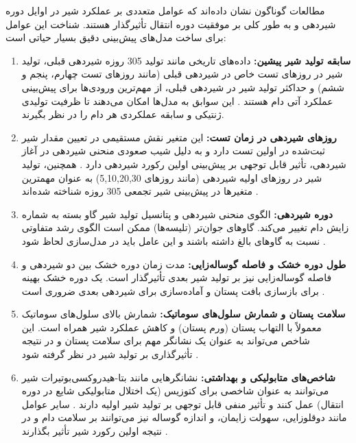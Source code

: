 مطالعات گوناگون نشان داده‌اند که عوامل متعددی بر عملکرد شیر در اوایل دوره شیردهی و به طور کلی بر موفقیت دوره انتقال تأثیرگذار هستند. شناخت این عوامل برای ساخت مدل‌های پیش‌بینی دقیق بسیار حیاتی است:
	\begin{enumerate}
	\item \textbf{سابقه تولید شیر پیشین:} داده‌های تاریخی مانند تولید 305 روزه شیردهی قبلی، تولید شیر در روزهای تست خاص در شیردهی قبلی (مانند روزهای تست چهارم، پنجم و ششم) و حداکثر تولید شیر در شیردهی قبلی، از مهم‌ترین ورودی‌ها برای پیش‌بینی عملکرد آتی دام هستند \cite{Salamone2022}. این سوابق به مدل‌ها امکان می‌دهند تا ظرفیت تولیدی ژنتیکی و سابقه عملکردی هر دام را در نظر بگیرند.
	
	\item \textbf{روزهای شیردهی در زمان تست:} این متغیر نقش مستقیمی در تعیین مقدار شیر ثبت‌شده در اولین تست دارد و به دلیل شیب صعودی منحنی شیردهی در آغاز شیردهی، تأثیر قابل توجهی بر پیش‌بینی اولین رکورد شیردهی دارد \cite{Salamone2022, Dallago2019}. همچنین، تولید شیر در روزهای اولیه شیردهی (مانند روزهای 5,10,20,30) به عنوان مهمترین متغیرها در پیش‌بینی شیر تجمعی 305 روزه شناخته شده‌اند \cite{GuevaraEscobar2022}.
	
	\item \textbf{دوره شیردهی:} الگوی منحنی شیردهی و پتانسیل تولید شیر گاو بسته به شماره زایش دام تغییر می‌کند. گاوهای جوان‌تر (تلیسه‌ها) ممکن است الگوی رشد متفاوتی نسبت به گاوهای بالغ داشته باشند و این عامل باید در مدل‌سازی لحاظ شود \cite{GuevaraEscobar2022, Dallago2019}.
	
	\item \textbf{طول دوره خشک و فاصله گوساله‌زایی:} مدت زمان دوره خشک بین دو شیردهی و فاصله گوساله‌زایی نیز بر تولید شیر بعدی تأثیرگذار است. یک دوره خشک بهینه برای بازسازی بافت پستان و آماده‌سازی برای شیردهی بعدی ضروری است \cite{Salamone2022}.
	
	\item \textbf{سلامت پستان و شمارش سلول‌های سوماتیک:} شمارش بالای سلول‌های سوماتیک معمولاً با التهاب پستان (ورم پستان) و کاهش عملکرد شیر همراه است. این شاخص می‌تواند به عنوان یک نشانگر مهم برای سلامت پستان و در نتیجه تأثیرگذاری بر تولید شیر در نظر گرفته شود \cite{GuevaraEscobar2022}.
	
	\item \textbf{شاخص‌های متابولیکی و بهداشتی:} نشانگرهایی مانند بتا-هیدروکسی‌بوتیرات شیر می‌توانند به عنوان شاخصی برای کتوزیس (یک اختلال متابولیکی شایع در دوره انتقال) عمل کنند و تأثیر منفی قابل توجهی بر تولید شیر اولیه دارند \cite{Dallago2019}. سایر عوامل مانند دوقلوزایی، سهولت زایمان، و اندازه گوساله نیز می‌توانند بر سلامت دام و در نتیجه اولین رکورد شیر تأثیر بگذارند \cite{Dallago2019}.
	

\end{enumerate}
